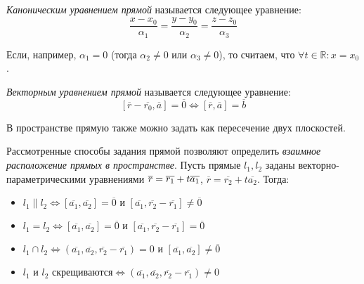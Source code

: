 \begin{definition}
	\textit{Каноническим уравнением прямой} называется следующее уравнение:
	\[\frac{x - x_0}{\alpha_1} = \frac{y - y_0}{\alpha_2} = \frac{z - z_0}{\alpha_3}\]
\end{definition}

\begin{note}
	Если, например, $\alpha_1 = 0$ (тогда $\alpha_2 \ne 0$ или $\alpha_3 \ne 0$), то считаем, что $\forall t\in\mathbb{R}: x = x_0$.
\end{note}

\begin{definition}
	\textit{Векторным уравнением прямой} называется следующее уравнение:
	\[[\overline{r} - \overline{r_0}, \overline{a}] = \overline{0} \Leftrightarrow [\overline{r}, \overline{a}] = \overline{b}\]
\end{definition}

\begin{note}
	В пространстве прямую также можно задать как пересечение двух плоскостей.
\end{note}

\begin{note}
	Рассмотренные способы задания прямой позволяют определить \textit{взаимное расположение прямых в пространстве}. Пусть прямые $l_1, l_2$ заданы векторно-параметрическими уравнениями $\overline{r} \hm{=} \overline{r_1} + t\overline{a_1}$, $\overline{r} = \overline{r_2} + t\overline{a_2}$. Тогда:
	\begin{itemize}
		\item $l_1 \parallel l_2 \Leftrightarrow [\overline{a_1}, \overline{a_2}] = \overline{0} \text{ и } [\overline{a_1}, \overline{r_2} - \overline{r_1}] \ne \overline{0}$
		\item $l_1 = l_2 \Leftrightarrow [\overline{a_1}, \overline{a_2}] = \overline{0} \text{ и } [\overline{a_1}, \overline{r_2} - \overline{r_1}] = \overline{0}$
		\item $l_1 \cap l_2 \Leftrightarrow (\overline{a_1}, \overline{a_2}, \overline{r_2} - \overline{r_1}) = 0 \text{ и } [\overline{a_1}, \overline{a_2}] \ne \overline{0}$
		\item $l_1 \text{ и } l_2 \text{ скрещиваются} \Leftrightarrow (\overline{a_1}, \overline{a_2}, \overline{r_2} - \overline{r_1}) \ne 0$
	\end{itemize}
\end{note}

